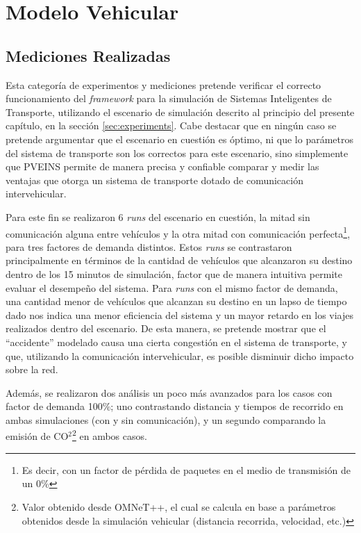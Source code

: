 \section{Modelo Vehicular}\label{sec:results:vehicular}

\subsection{Mediciones Realizadas}

Esta categoría de experimentos y mediciones pretende verificar el correcto funcionamiento del \emph{framework} para la simulación de Sistemas Inteligentes de Transporte, utilizando el escenario de simulación descrito al principio del presente capítulo, en la sección \ref{sec:experiments}. Cabe destacar que en ningún caso se pretende argumentar que el escenario en cuestión es óptimo, ni que lo parámetros del sistema de transporte son los correctos para este escenario, sino simplemente que PVEINS permite de manera precisa y confiable comparar y medir las ventajas que otorga un sistema de transporte dotado de comunicación intervehicular.

Para este fin se realizaron 6 \emph{runs} del escenario en cuestión, la mitad sin comunicación alguna entre vehículos y la otra mitad con comunicación perfecta\footnote{Es decir, con un factor de pérdida de paquetes en el medio de transmisión de un 0\%}, para tres factores de demanda distintos. Estos \emph{runs} se contrastaron principalmente en términos de la cantidad de vehículos que alcanzaron su destino dentro de los 15 minutos de simulación, factor que de manera intuitiva permite evaluar el desempeño del sistema. Para \emph{runs} con el mismo factor de demanda, una cantidad menor de vehículos que alcanzan su destino en un lapso de tiempo dado nos indica una menor eficiencia del sistema y un mayor retardo en los viajes realizados dentro del escenario. De esta manera, se pretende mostrar que el ``accidente'' modelado causa una cierta congestión en el sistema de transporte, y que, utilizando la comunicación intervehicular, es posible disminuir dicho impacto sobre la red. 

Además, se realizaron dos análisis un poco más avanzados para los casos con factor de demanda 100\%; uno contrastando distancia y tiempos de recorrido en ambas simulaciones (con y sin comunicación), y un segundo comparando la emisión de CO$^2$\footnote{Valor obtenido desde OMNeT++, el cual se calcula en base a parámetros obtenidos desde la simulación vehicular (distancia recorrida, velocidad, etc.)} en ambos casos. 

